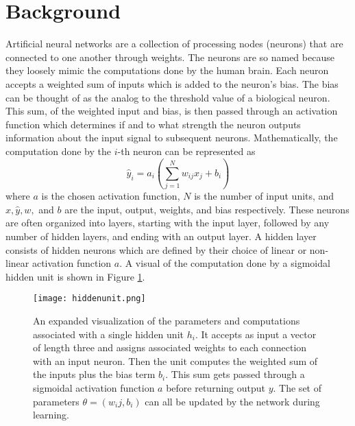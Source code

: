 \documentclass[12pt]{article}
\begin{document}
\section{Background}
\indent Artificial neural networks are a collection of processing nodes (neurons) that are connected to one another through weights. The neurons are so named because they loosely mimic the computations done by the human brain. Each neuron accepts a weighted sum of inputs which is added to the neuron's bias. The bias can be thought of as the analog to the threshold value of a biological neuron. This sum, of the weighted input and bias, is then passed through an activation function which determines if and to what strength the neuron outputs information about the input signal to subsequent neurons. Mathematically, the computation done by the $i$-th neuron can be represented as
\begin{equation}
  \hat y_i = a_i(\sum_{j=1}^N w_{ij}x_j + b_i)
  \label{eq:unit}
\end{equation}
where $a$ is the chosen activation function, $N$ is the number of input units, and $x,\hat y,w,$ and $b$ are the input, output, weights, and bias respectively. These neurons are often organized into layers, starting with the input layer, followed by any number of hidden layers, and ending with an output layer. A hidden layer consists of hidden neurons which are defined by their choice of linear or non-linear activation function $a$. A visual of the computation done by a sigmoidal hidden unit is shown in Figure \ref{fig:hiddenunit}.  \\
\begin{figure}[ht]
  \centering
  \texttt{[image: hiddenunit.png]}
  \caption{An expanded visualization of the parameters and computations associated with a single hidden unit $h_i$. It accepts as input a vector of length three and assigns associated weights to each connection with an input neuron. Then the unit computes the weighted sum of the inputs plus the bias term $b_i$. This sum gets passed through a sigmoidal activation function $a$ before returning output $y$. The set of parameters $\theta = (w_ij,b_i)$ can all be updated by the network during learning.}
  \label{fig:hiddenunit}
\end{figure}
\end{document}

